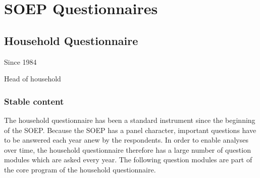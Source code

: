 \documentclass[letterpaper,10pt,openany,onesideH,english]{sphinxmanual}
\begin{document}
\begin{figure}[H]
\centering
{}\end{figure}


\section{SOEP Questionnaires}
\label{\detokenize{Contents of SOEPcore/index:soep-questionnaires}}
\begin{figure}[H]
\centering

\noindent{}
\end{figure}


\subsection{Household Questionnaire}
\label{\detokenize{Contents of SOEPcore/index:household-questionnaire}}\label{\detokenize{Contents of SOEPcore/index:id1}}
 Since 1984

 Head of household


\subsubsection{Stable content}
\label{\detokenize{Contents of SOEPcore/index:stable-content}}
The household questionnaire has been a standard instrument since the beginning of the SOEP. Because the SOEP has a panel character, important questions have to be answered each year anew by the respondents. In order to enable analyses over time, the household questionnaire therefore has a large number of question modules which are asked every year. The following question modules are part of the core program of the household questionnaire.
\end{document}
